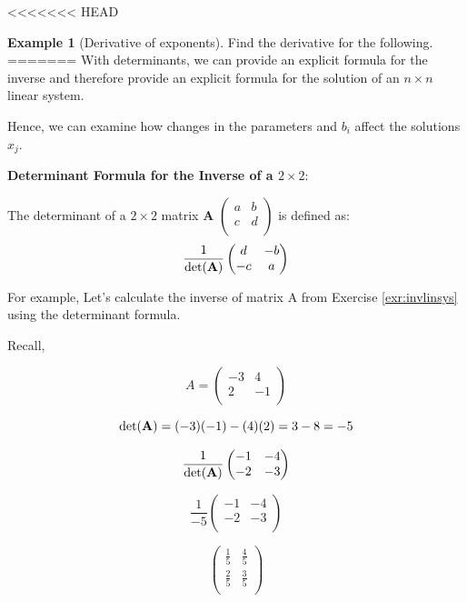 \documentclass[]{book}
\theoremstyle{definition}
\theoremstyle{definition}
\newtheorem{example}{Example}[chapter]
\theoremstyle{definition}
\theoremstyle{remark}
\begin{document}
<<<<<<< HEAD
\begin{example}[Derivative of exponents]
\protect\hypertarget{exm:exmderivexp}{}{\label{exm:exmderivexp} {} }Find the derivative for the following.
=======
With determinants, we can provide an explicit formula for the inverse and
therefore provide an explicit formula for the solution of an \(n\times n\) linear system.

Hence, we can examine how changes in the parameters and \(b_i\) affect the solutions \(x_j\).

\textbf{Determinant Formula for the Inverse of a \(2 \times 2\)}:

The determinant of a \(2 \times 2\) matrix \textbf{A} \(\begin{pmatrix} a & b\\ c & d\\ \end{pmatrix}\) is defined as:
\[\frac{1}{\det({\bf A})} \begin{pmatrix}
            d & -b\\
            -c & a\\
        \end{pmatrix}\]

For example, Let's calculate the inverse of matrix A from Exercise \ref{exr:invlinsys} using the determinant formula.

Recall,

\[A = \begin{pmatrix}
            -3 & 4\\
            2 & -1\\
        \end{pmatrix}\]

\[\det({\bf A}) = (-3)(-1) - (4)(2) = 3 - 8  = -5\]

\[\frac{1}{\det({\bf A})} \begin{pmatrix}
            -1 & -4\\
            -2 & -3\\
        \end{pmatrix}\]

\[\frac{1}{-5} \begin{pmatrix}
            -1 & -4\\
            -2 & -3\\
        \end{pmatrix}\]

\[ \begin{pmatrix}
            \frac{1}{5} & \frac{4}{5}\\
            \frac{2}{5} & \frac{3}{5}\\
        \end{pmatrix}\]


\end{example}
\end{document}
